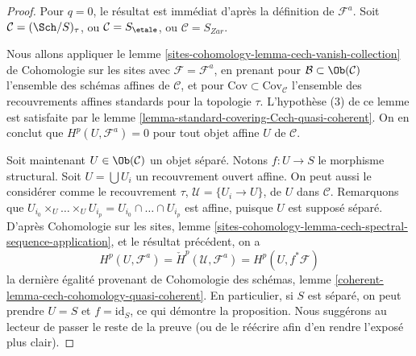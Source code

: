 \begin{proof}
Pour $q = 0$, le résultat est immédiat d'après la définition de
$\mathcal{F}^a$. Soit $\mathcal{C} = (\Sch/S)_\tau$, ou
$\mathcal{C} = S_\etale$, ou $\mathcal{C} = S_{Zar}$.

\medskip\noindent
Nous allons appliquer le lemme
\ref{sites-cohomology-lemma-cech-vanish-collection} de Cohomologie sur les
sites avec $\mathcal{F} = \mathcal{F}^a$, en prenant pour
$\mathcal{B} \subset \Ob(\mathcal{C})$ l'ensemble des schémas affines de
$\mathcal{C}$, et pour $\text{Cov} \subset \text{Cov}_\mathcal{C}$
l'ensemble des recouvrements affines standards pour la topologie $\tau$.
L'hypothèse (3) de ce lemme est satisfaite par le lemme
\ref{lemma-standard-covering-Cech-quasi-coherent}. On en conclut que
$H^p(U, \mathcal{F}^a) = 0$ pour tout objet affine $U$ de $\mathcal{C}$.

\medskip\noindent
Soit maintenant $U \in \Ob(\mathcal{C})$ un objet séparé. Notons
$f : U \to S$ le morphisme structural. Soit $U = \bigcup U_i$ un
recouvrement ouvert affine. On peut aussi le considérer comme le
recouvrement $\tau$, $\mathcal{U} = \{U_i \to U\}$, de $U$ dans
$\mathcal{C}$. Remarquons que
$U_{i_0} \times_U \ldots \times_U U_{i_p} =
U_{i_0} \cap \ldots \cap U_{i_p}$ est affine, puisque $U$ est supposé
séparé. D'après Cohomologie sur les sites, lemme
\ref{sites-cohomology-lemma-cech-spectral-sequence-application}, et le
résultat précédent, on a
$$
H^p(U, \mathcal{F}^a) = \check{H}^p(\mathcal{U}, \mathcal{F}^a)
= H^p(U, f^*\mathcal{F})
$$
la dernière égalité provenant de Cohomologie des schémas, lemme
\ref{coherent-lemma-cech-cohomology-quasi-coherent}. En particulier, si
$S$ est séparé, on peut prendre $U = S$ et $f = \text{id}_S$, ce qui
démontre la proposition. Nous suggérons au lecteur de passer le reste de
la preuve (ou de le réécrire afin d'en rendre l'exposé plus clair).


\end{proof}

